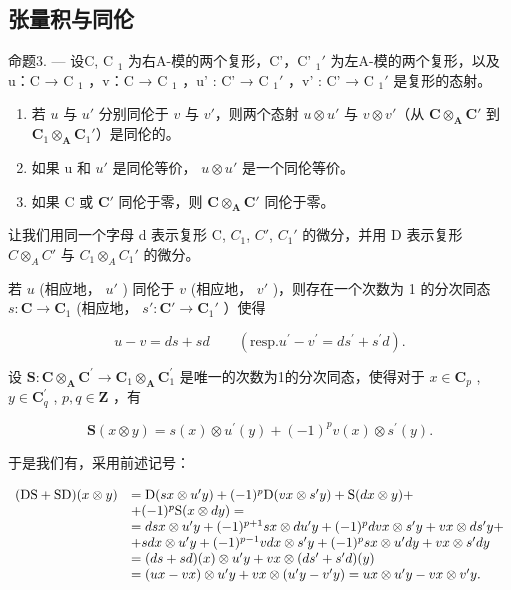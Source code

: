\subsection{张量积与同伦}

命题3. --- 设C, C \(_{1}\) 为右A-模的两个复形，C'，C' \(_{1}'\) 为左A-模的两个复形，以及u：C → C \(_{1}\) ，v：C → C \(_{1}\) ，u' : C' → C \(_{1}'\) ，v' : C' → C \(_{1}'\) 是复形的态射。

\begin{enumerate}
\def\labelenumi{\alph{enumi})}
\item
  若 \(u\) 与 \(u'\) 分别同伦于 \(v\) 与 \(v'\)，则两个态射 \(u \otimes u'\) 与 \(v \otimes v'\)（从 \(\mathbf{C} \otimes_{\mathbf{A}} \mathbf{C}'\) 到 \(\mathbf{C}_1 \otimes_{\mathbf{A}} \mathbf{C}_1'\)）是同伦的。
\item
  如果 u 和 \(u'\) 是同伦等价， \(u \otimes u'\) 是一个同伦等价。
\item
  如果 C 或 \(\mathbf{C}'\) 同伦于零，则 \(\mathbf{C} \otimes_{\mathbf{A}} \mathbf{C}'\) 同伦于零。
\end{enumerate}

让我们用同一个字母 d 表示复形 C, \(C_{1}\), \(C'\), \(C_{1}'\) 的微分，并用 D 表示复形 \(C \otimes_{A} C'\) 与 \(C_{1} \otimes_{A} C_{1}'\) 的微分。

若 \(u\) (相应地， \(u'\) ) 同伦于 \(v\) (相应地， \(v'\) )，则存在一个次数为 1 的分次同态 \(s: \mathbf{C} \to \mathbf{C}_1\) (相应地， \(s': \mathbf{C}' \to \mathbf{C}_1'\) ）使得

\[
u - v = d s + s d \qquad (\mathrm{resp.} u ^ {\prime} - v ^ {\prime} = d s ^ {\prime} + s ^ {\prime} d).\tag{2}
\]

设 \(\mathbf{S}:\mathbf{C}\otimes_{\mathbf{A}}\mathbf{C}^{\prime}\to \mathbf{C}_{1}\otimes_{\mathbf{A}}\mathbf{C}_{1}^{\prime}\) 是唯一的次数为1的分次同态，使得对于 \(x\in \mathbf{C}_p\) , \(y\in \mathbf{C}_q^\prime\) , \(p,q\in \mathbf{Z}\) ，有

\[
\mathbf {S} (x \otimes y) = s (x) \otimes u ^ {\prime} (y) + (- 1) ^ {p} v (x) \otimes s ^ {\prime} (y).\tag{3}
\]

于是我们有，采用前述记号：

\[
\begin{array}{r l} (\mathrm{DS} + \mathrm{SD}) (x \otimes y) & = \mathrm{D} (s x \otimes u ^ {\prime} y) + (- 1) ^ {p} \mathrm{D} (v x \otimes s ^ {\prime} y) + \mathrm{S} (d x \otimes y) + \\ & + (- 1) ^ {p} \mathrm{S} (x \otimes d y) = \\ & = d s x \otimes u ^ {\prime} y + (- 1) ^ {p + 1} s x \otimes d u ^ {\prime} y + (- 1) ^ {p} d v x \otimes s ^ {\prime} y + v x \otimes d s ^ {\prime} y + \\ & + s d x \otimes u ^ {\prime} y + (- 1) ^ {p - 1} v d x \otimes s ^ {\prime} y + (- 1) ^ {p} s x \otimes u ^ {\prime} d y + v x \otimes s ^ {\prime} d y \\ & = (d s + s d) (x) \otimes u ^ {\prime} y + v x \otimes (d s ^ {\prime} + s ^ {\prime} d) (y) \\ & = (u x - v x) \otimes u ^ {\prime} y + v x \otimes (u ^ {\prime} y - v ^ {\prime} y) = u x \otimes u ^ {\prime} y - v x \otimes v ^ {\prime} y. \end{array}
\]

